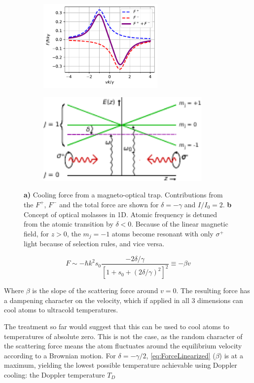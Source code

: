 \begin{figure}
	\begin{subfigure}{.42\textwidth}
		\includegraphics[height=4.5cm]{figures/MOTplot.pdf}
		\caption{}
		\label{fig:MOTcooling}
	\end{subfigure}
	\hfill
	\begin{subfigure}{.55\textwidth}
		\includegraphics[height=4.5cm]{figures/OpticalMolasses.pdf}
		\caption{}
		\label{fig:MOTconcept}
	\end{subfigure}
	\caption{\textbf{a)} Cooling force from a magneto-optical trap. 
	Contributions from the $F^+$, $F^-$ and the total force are shown for $\delta = -\gamma$ and $I/I_0 = 2.$ 
	\textbf{b} Concept of optical molasses in 1D. 
	Atomic frequency is detuned from the atomic transition by $\delta<0$.
	Because of the linear magnetic field, for $z>0$, the $m_j=-1$ atoms become resonant with only $\sigma^+$ light because of selection rules, and vice versa.}
	\label{fig:MOTPlots}
\end{figure}

\begin{equation}\label{eq:ForceLinearized}
	F \sim - \hbar k^2 s_0 \frac{-2\delta/\gamma}{\left[1+s_0+(2\delta/\gamma)^2\right]^2} \equiv -\beta v
\end{equation}

Where $\beta$ is the slope of the scattering force around $v=0$. 
The resulting force has a dampening character on the velocity, which if applied in all 3 dimensions can cool atoms to ultracold temperatures. 

The treatment so far would suggest that this can be used to cool atoms to temperatures of absolute zero. 
This is not the case, as the random character of the scattering force means the atom fluctuates around the equilibrium velocity according to a Brownian motion. 
For $\delta=-\gamma/2$, \cref{eq:ForceLinearized} ($\beta$) is at a maximum, yielding the lowest possible temperature achievable using Doppler cooling: the Doppler temperature $T_D$ \cite{Metcalf1999}

